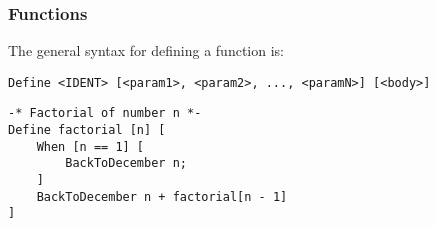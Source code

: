 \subsubsection{Functions}
The general syntax for defining a function is:
\begin{verbatim}
Define <IDENT> [<param1>, <param2>, ..., <paramN>] [<body>]
\end{verbatim}
\begin{verbatim}
-* Factorial of number n *-
Define factorial [n] [
    When [n == 1] [
        BackToDecember n;
    ]
    BackToDecember n + factorial[n - 1]
]
\end{verbatim}